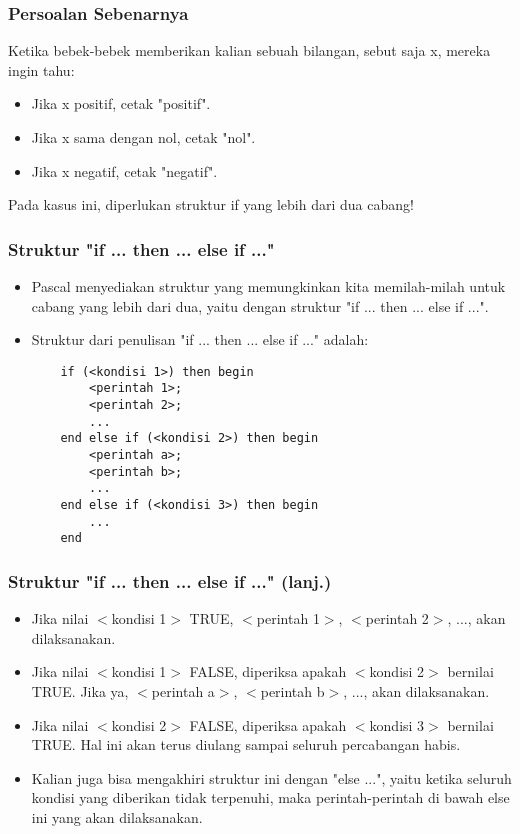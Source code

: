 \documentclass{beamer}
\begin{document}
\begin{frame}
\frametitle{Persoalan Sebenarnya}
Ketika bebek-bebek memberikan kalian sebuah bilangan, sebut saja x, mereka ingin tahu:
\begin{itemize}
	\item Jika x positif, cetak "positif".
	\item Jika x sama dengan nol, cetak "nol".
	\item Jika x negatif, cetak "negatif".
\end{itemize}

Pada kasus ini, diperlukan struktur if yang lebih dari dua cabang!
\end{frame}

\begin{frame}[fragile]
\frametitle{Struktur "if ... then ... else if ..."}
\begin{itemize}
	\item Pascal menyediakan struktur yang memungkinkan kita memilah-milah untuk cabang yang lebih dari dua, yaitu dengan struktur "if ... then ... else if ...".
	\item Struktur dari penulisan "if ... then ... else if ..." adalah:
	\begin{lstlisting}
	if (<kondisi 1>) then begin
	    <perintah 1>;
	    <perintah 2>;
	    ...
	end else if (<kondisi 2>) then begin
	    <perintah a>;
	    <perintah b>;
	    ...	
	end else if (<kondisi 3>) then begin
	    ...
	end
	\end{lstlisting}

\end{itemize}
\end{frame}

\begin{frame}
\frametitle{Struktur "if ... then ... else if ..." (lanj.)}
\begin{itemize}
	\item Jika nilai $<$kondisi 1$>$ TRUE, $<$perintah 1$>$, $<$perintah 2$>$, ..., akan dilaksanakan.
	\item Jika nilai $<$kondisi 1$>$ FALSE, diperiksa apakah $<$kondisi 2$>$ bernilai TRUE. Jika ya, $<$perintah a$>$, $<$perintah b$>$, ..., akan dilaksanakan.
	\item Jika nilai $<$kondisi 2$>$ FALSE, diperiksa apakah $<$kondisi 3$>$ bernilai TRUE. Hal ini akan terus diulang sampai seluruh percabangan habis.
	\item Kalian juga bisa mengakhiri struktur ini dengan "else ...", yaitu ketika seluruh kondisi yang diberikan tidak terpenuhi, maka perintah-perintah di bawah else ini yang akan dilaksanakan.
\end{itemize}
\end{frame}
\end{document}
